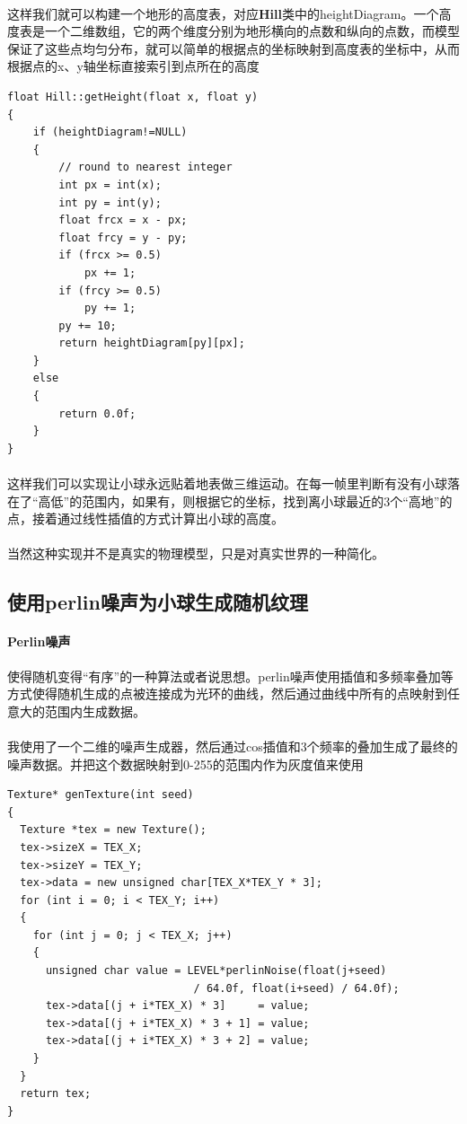 \documentclass{article}
\begin{document}
            \paragraph{}
                这样我们就可以构建一个地形的高度表，对应\textbf{Hill}类中的heightDiagram。一个高度表是一个二维数组，它的两个维度分别为地形横向的点数和纵向的点数，而模型保证了这些点均匀分布，就可以简单的根据点的坐标映射到高度表的坐标中，从而根据点的x、y轴坐标直接索引到点所在的高度
            \begin{lstlisting}[language={[ANSI]C}]
float Hill::getHeight(float x, float y)
{
	if (heightDiagram!=NULL)
	{
		// round to nearest integer
		int px = int(x);
		int py = int(y);
		float frcx = x - px;
		float frcy = y - py;
		if (frcx >= 0.5)
			px += 1;
		if (frcy >= 0.5)
			py += 1;
		py += 10;
		return heightDiagram[py][px];
	}
	else
	{
		return 0.0f;
	}
}
            \end{lstlisting}
            \paragraph{}
                这样我们可以实现让小球永远贴着地表做三维运动。在每一帧里判断有没有小球落在了“高低”的范围内，如果有，则根据它的坐标，找到离小球最近的3个“高地”的点，接着通过线性插值的方式计算出小球的高度。
            \paragraph{}
                当然这种实现并不是真实的物理模型，只是对真实世界的一种简化。
        \subsection{使用perlin噪声为小球生成随机纹理}
            \paragraph{Perlin噪声}
                使得随机变得“有序”的一种算法或者说思想。perlin噪声使用插值和多频率叠加等方式使得随机生成的点被连接成为光环的曲线，然后通过曲线中所有的点映射到任意大的范围内生成数据。
            \paragraph{}
                我使用了一个二维的噪声生成器，然后通过cos插值和3个频率的叠加生成了最终的噪声数据。并把这个数据映射到0-255的范围内作为灰度值来使用
            \begin{lstlisting}[language={[ANSI]C}]
Texture* genTexture(int seed)
{
  Texture *tex = new Texture();
  tex->sizeX = TEX_X;
  tex->sizeY = TEX_Y;
  tex->data = new unsigned char[TEX_X*TEX_Y * 3];
  for (int i = 0; i < TEX_Y; i++)
  {
  	for (int j = 0; j < TEX_X; j++)
	{
	  unsigned char value = LEVEL*perlinNoise(float(j+seed)
                             / 64.0f, float(i+seed) / 64.0f);
	  tex->data[(j + i*TEX_X) * 3]     = value;
	  tex->data[(j + i*TEX_X) * 3 + 1] = value;
	  tex->data[(j + i*TEX_X) * 3 + 2] = value;
	}
  }
  return tex;
}
            \end{lstlisting}
\end{document}
